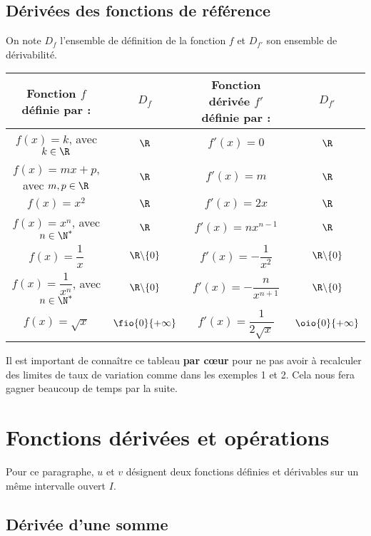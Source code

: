 \documentclass[a4paper,11pt,cours]{nsi} %
\begin{document}
\subsection*{Dérivées des fonctions de référence}
\begin{propriete}[ ]
	On note $D_f$ l'ensemble de définition de la fonction $f$ et $D_{f'}$ son ensemble de dérivabilité.\\
	
	\renewcommand{\arraystretch}{2}
	\begin{tabular}{|c|c|c|c|}
		\hline
		\textbf{Fonction $f$ définie par :} & $D_f$ & \textbf{Fonction dérivée $f'$ définie par :} & $D_{f'}$\\
		\hline
		
		$f(x)=k$, avec $k\in \R$ & $\R$ & $f'(x)=0$ & $\R$ \\
		\hline
		$f(x)=mx+p$, avec $m,p \in \R$ & $\R$ & $f'(x)=m$ & $\R$ \\
		\hline
		$f(x)=x^2$ & $\R$ & $f'(x)=2x$ & $\R$ \\
		\hline
		$f(x)=x^n$, avec $n\in \N^*$ & $\R$ & $f'(x)=nx^{n-1}$ & $\R$ \\
		\hline
		$f(x)=\dfrac{1}{x}$ & $\R \backslash \{0\}$ & $f'(x)=-\dfrac{1}{x^2}$ & $\R\backslash \{0\}$ \\
		\hline
		$f(x)=\dfrac{1}{x^n}$, avec $n\in \N^* $& $\R \backslash \{0\}$ & $f'(x)=-\dfrac{n}{x^{n+1}}$ & $\R\backslash \{0\}$ \\
		\hline
		$f(x)=\sqrt{x}$ & $\fio{0}{+\infty}$ & $f'(x)=\dfrac{1}{2\sqrt{x}}$ & $\oio{0}{+\infty}$\\
		\hline
	\end{tabular}
\end{propriete}

Il est important de connaître ce tableau \textbf{par cœur} pour ne pas avoir à recalculer des limites de taux de variation comme dans les exemples 1 et 2. Cela nous fera gagner beaucoup de temps par la suite.

\section{Fonctions dérivées et opérations}
Pour ce paragraphe, $u$ et $v$ désignent deux fonctions définies et dérivables sur un même intervalle ouvert $I$.
\subsection{Dérivée d'une somme}
\end{document}
